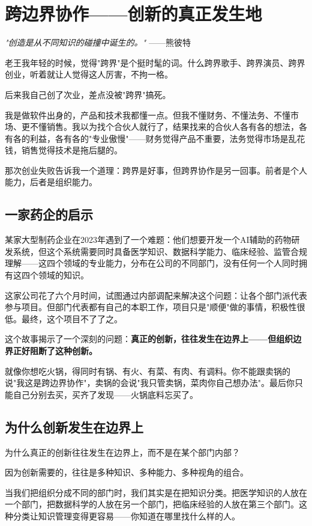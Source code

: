 \chapter{跨边界协作——创新的真正发生地}


\textit{"创造是从不同知识的碰撞中诞生的。"}
——熊彼特


老王我年轻的时候，觉得"跨界"是个挺时髦的词。什么跨界歌手、跨界演员、跨界创业，听着就让人觉得这人厉害，不拘一格。

后来我自己创了次业，差点没被"跨界"搞死。

我是做软件出身的，产品和技术我都懂一点。但我不懂财务、不懂法务、不懂市场、更不懂销售。我以为找个合伙人就行了，结果找来的合伙人各有各的想法，各有各的利益，各有各的"专业傲慢"——财务觉得产品不重要，法务觉得市场是乱花钱，销售觉得技术是拖后腿的。

那次创业失败告诉我一个道理：跨界是好事，但跨界协作是另一回事。前者是个人能力，后者是组织能力。

\section{一家药企的启示}


某家大型制药企业在2023年遇到了一个难题：他们想要开发一个AI辅助的药物研发系统，但这个系统需要同时具备医学知识、数据科学能力、临床经验、监管合规理解——这四个领域的专业能力，分布在公司的不同部门，没有任何一个人同时拥有这四个领域的知识。

这家公司花了六个月时间，试图通过内部调配来解决这个问题：让各个部门派代表参与项目。但部门代表都有自己的本职工作，项目只是"顺便"做的事情，积极性很低。最终，这个项目不了了之。

这个故事揭示了一个深刻的问题：\textbf{真正的创新，往往发生在边界上——但组织边界正好阻断了这种创新。}

就像你想吃火锅，得同时有锅、有火、有菜、有肉、有调料。你不能跟卖锅的说"我这是跨边界协作"，卖锅的会说"我只管卖锅，菜肉你自己想办法"。最后你只能自己分别去买，买齐了发现——火锅底料忘买了。

\section{为什么创新发生在边界上}


为什么真正的创新往往发生在边界上，而不是在某个部门内部？

因为创新需要的，往往是多种知识、多种能力、多种视角的组合。

当我们把组织分成不同的部门时，我们其实是在把知识分类。把医学知识的人放在一个部门，把数据科学的人放在另一个部门，把临床经验的人放在第三个部门。这种分类让知识管理变得更容易——你知道在哪里找什么样的人。

